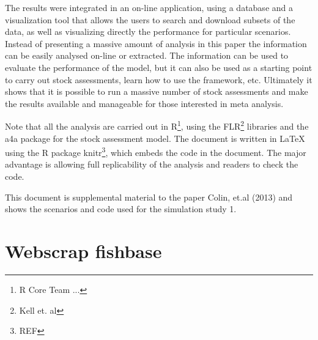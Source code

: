 \documentclass[a4paper]{article}\usepackage{graphicx, color}
\makeatletter
\newenvironment{kframe}{%
 \def\at@end@of@kframe{}%
 \ifinner\ifhmode%
  \def\at@end@of@kframe{\end{minipage}}%
  \begin{minipage}{\columnwidth}%
 \fi\fi%
 \def\FrameCommand##1{\hskip\@totalleftmargin \hskip-\fboxsep
 \colorbox{shadecolor}{##1}\hskip-\fboxsep
     \hskip-\linewidth \hskip-\@totalleftmargin \hskip\columnwidth}%
 \MakeFramed {\advance\hsize-\width
   \@totalleftmargin\z@ \linewidth\hsize
   \@setminipage}}%
 {\par\unskip\endMakeFramed%
 \at@end@of@kframe}
\newenvironment{knitrout}{}{} %
\makeatother
\begin{document}
The results were integrated in an on-line application, using a database and a visualization tool that allows the users to search and download subsets of the data, as well as visualizing directly the performance for particular scenarios. Instead of presenting a massive amount of analysis in this paper the information can be easily analysed on-line or extracted. The information can be used to evaluate the performance of the model, but it can also be used as a starting point to carry out stock assessments, learn how to use the framework, etc. Ultimately it shows that it is possible to run a massive number of stock assessments and make the results available and manageable for those interested in meta analysis. 

Note that all the analysis are carried out in R\footnote{R Core Team ...}, using the FLR\footnote{Kell et. al} libraries and the a4a package for the stock assessment model. The document is written in LaTeX using the R package knitr\footnote{REF}, which embeds the code in the document. The major advantage is allowing full replicability of the analysis and readers to check the code.

This document is supplemental material to the paper Colin, et.al (2013) and shows the scenarios and code used for the simulation study 1.

\section{Webscrap fishbase}

\begin{knitrout}
\color{fgcolor}\begin{kframe}


{\ttfamily\noindent\bfseries\color{errorcolor}{\#\# Error: there is no package called 'FLAdvice'}}

{\ttfamily\noindent\bfseries\color{errorcolor}{\#\# Error: no existing definition for function 'sv'}}\end{kframe}
\end{knitrout}
\end{document}
